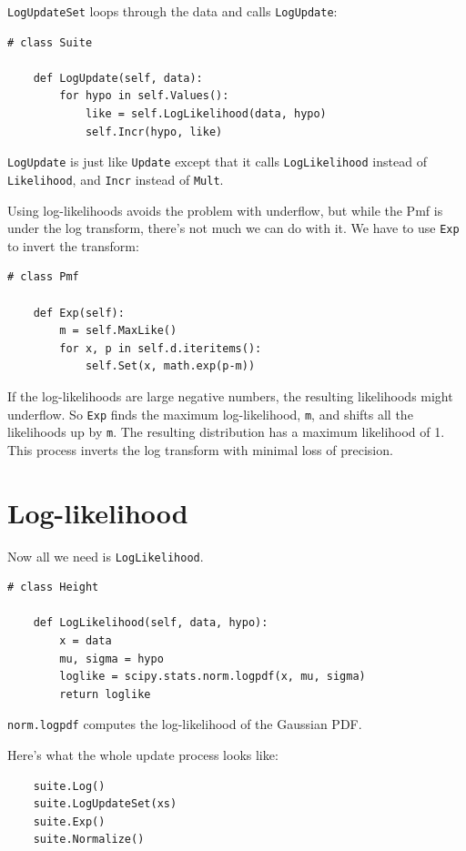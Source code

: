 \documentclass[12pt]{book}
\begin{document}
{\tt LogUpdateSet} loops through the data and calls {\tt LogUpdate}:

\begin{verbatim}
# class Suite

    def LogUpdate(self, data):
        for hypo in self.Values():
            like = self.LogLikelihood(data, hypo)
            self.Incr(hypo, like)
\end{verbatim}

{\tt LogUpdate} is just like {\tt Update} except that it calls
{\tt LogLikelihood} instead of {\tt Likelihood}, and {\tt Incr}
instead of {\tt Mult}.

Using log-likelihoods avoids the problem with underflow, but while
the Pmf is under the log transform, there's not much we can do with
it.  We have to use {\tt Exp} to invert the transform:

\begin{verbatim}
# class Pmf

    def Exp(self):
        m = self.MaxLike()
        for x, p in self.d.iteritems():
            self.Set(x, math.exp(p-m))
\end{verbatim}

If the log-likelihoods are large negative numbers, the resulting
likelihoods might underflow.  So {\tt Exp} finds the maximum
log-likelihood, {\tt m}, and shifts all the likelihoods up by {\tt m}.
The resulting distribution has a maximum likelihood of 1.  This
process inverts the log transform with minimal loss of precision.


\section{Log-likelihood}

Now all we need is {\tt LogLikelihood}.

\begin{verbatim}
# class Height

    def LogLikelihood(self, data, hypo):
        x = data
        mu, sigma = hypo
        loglike = scipy.stats.norm.logpdf(x, mu, sigma)
        return loglike
\end{verbatim}

{\tt norm.logpdf} computes the log-likelihood of the
Gaussian PDF.


Here's what the whole update process looks like:

\begin{verbatim}
    suite.Log()
    suite.LogUpdateSet(xs)
    suite.Exp()
    suite.Normalize()
\end{verbatim}
\end{document}
